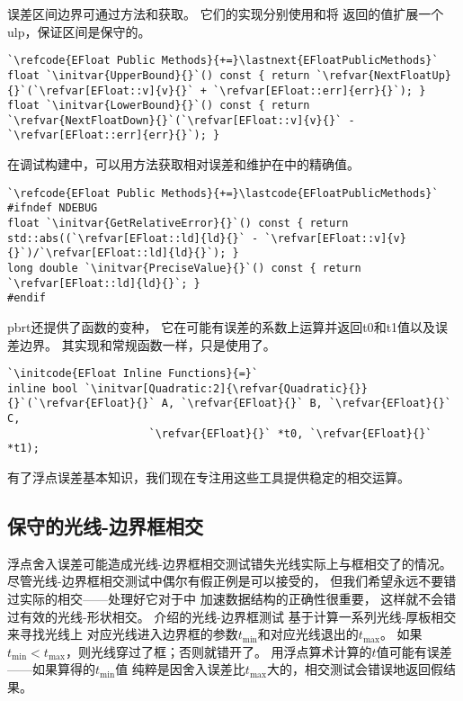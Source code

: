 误差区间边界可通过方法和获取。
它们的实现分别使用和将
返回的值扩展一个ulp，保证区间是保守的。
\begin{lstlisting}
`\refcode{EFloat Public Methods}{+=}\lastnext{EFloatPublicMethods}`
float `\initvar{UpperBound}{}`() const { return `\refvar{NextFloatUp}{}`(`\refvar[EFloat::v]{v}{}` + `\refvar[EFloat::err]{err}{}`); }
float `\initvar{LowerBound}{}`() const { return `\refvar{NextFloatDown}{}`(`\refvar[EFloat::v]{v}{}` - `\refvar[EFloat::err]{err}{}`); }
\end{lstlisting}

在调试构建中，可以用方法获取相对误差和维护在中的精确值。
\begin{lstlisting}
`\refcode{EFloat Public Methods}{+=}\lastcode{EFloatPublicMethods}`
#ifndef NDEBUG
float `\initvar{GetRelativeError}{}`() const { return std::abs((`\refvar[EFloat::ld]{ld}{}` - `\refvar[EFloat::v]{v}{}`)/`\refvar[EFloat::ld]{ld}{}`); }
long double `\initvar{PreciseValue}{}`() const { return `\refvar[EFloat::ld]{ld}{}`; }
#endif
\end{lstlisting}

pbrt还提供了函数的变种，
它在可能有误差的系数上运算并返回{\ttfamily t0}和{\ttfamily t1}值以及误差边界。
其实现和常规函数一样，只是使用了。
\begin{lstlisting}
`\initcode{EFloat Inline Functions}{=}`
inline bool `\initvar[Quadratic:2]{\refvar{Quadratic}{}}{}`(`\refvar{EFloat}{}` A, `\refvar{EFloat}{}` B, `\refvar{EFloat}{}` C,
                      `\refvar{EFloat}{}` *t0, `\refvar{EFloat}{}` *t1);
\end{lstlisting}

有了浮点误差基本知识，我们现在专注用这些工具提供稳定的相交运算。

\subsection{保守的光线-边界框相交}\label{sub:保守的光线-边界框相交}
浮点舍入误差可能造成光线-边界框相交测试错失光线实际上与框相交了的情况。
尽管光线-边界框相交测试中偶尔有假正例是可以接受的，
但我们希望永远不要错过实际的相交——处理好它对于中
加速数据结构的正确性很重要，
这样就不会错过有效的光线-形状相交。
介绍的光线-边界框测试
基于计算一系列光线-厚板相交来寻找光线上
对应光线进入边界框的参数$t_{\min}$和对应光线退出的$t_{\max}$。
如果$t_{\min}<t_{\max}$，则光线穿过了框；否则就错开了。
用浮点算术计算的$t$值可能有误差——如果算得的$t_{\min}$值
纯粹是因舍入误差比$t_{\max}$大的，相交测试会错误地返回假结果。

